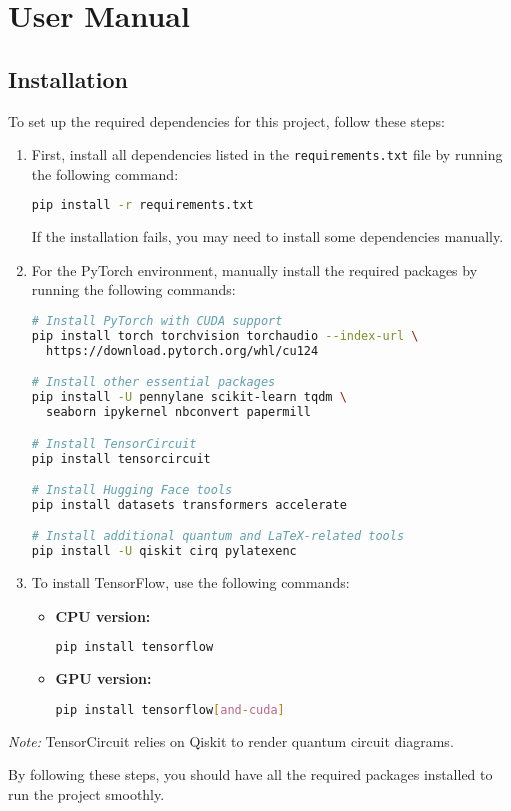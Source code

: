 \chapter{User Manual}
\label{chap:manual}

\section{Installation}
\label{sec:installation}

To set up the required dependencies for this project, follow these steps:

\begin{enumerate}
  \item First, install all dependencies listed in the
    \texttt{requirements.txt} file by running the following command:

    \begin{lstlisting}[language=bash]
pip install -r requirements.txt
    \end{lstlisting}

    If the installation fails, you may need to install some
    dependencies manually.

  \item For the PyTorch environment, manually install the required
    packages by running the following commands:

    \begin{lstlisting}[language=bash]
# Install PyTorch with CUDA support
pip install torch torchvision torchaudio --index-url \
  https://download.pytorch.org/whl/cu124

# Install other essential packages
pip install -U pennylane scikit-learn tqdm \
  seaborn ipykernel nbconvert papermill

# Install TensorCircuit
pip install tensorcircuit

# Install Hugging Face tools
pip install datasets transformers accelerate

# Install additional quantum and LaTeX-related tools
pip install -U qiskit cirq pylatexenc
    \end{lstlisting}

  \item To install TensorFlow, use the following commands:

    \begin{itemize}
      \item \textbf{CPU version:}
        \begin{lstlisting}[language=bash]
pip install tensorflow
        \end{lstlisting}

      \item \textbf{GPU version:}
        \begin{lstlisting}[language=bash]
pip install tensorflow[and-cuda]
        \end{lstlisting}
    \end{itemize}

\end{enumerate}

\noindent\textit{Note:} TensorCircuit relies on Qiskit to render
quantum circuit diagrams.

By following these steps, you should have all the required packages
installed to run the project smoothly.
